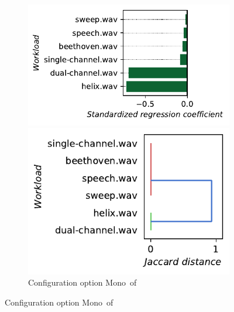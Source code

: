 \begin{figure}
	\centering
	\begin{subfigure}{0.99\linewidth}
		\begin{minipage}{0.5\linewidth}
			\includegraphics[width=\linewidth]{images/plots/jump3r_Mono_influences.pdf}
		\end{minipage}
		\begin{minipage}{0.5\linewidth}
			\includegraphics[width=\linewidth]{images/plots/jump3r_Mono_workloads.pdf}
		\end{minipage}
		\caption{Configuration option \guillemotleft\textsf{Mono}\guillemotright~of \jumper}
		\label{fig:results_rq3_jump3r}
	\end{subfigure}
	

\end{figure}
